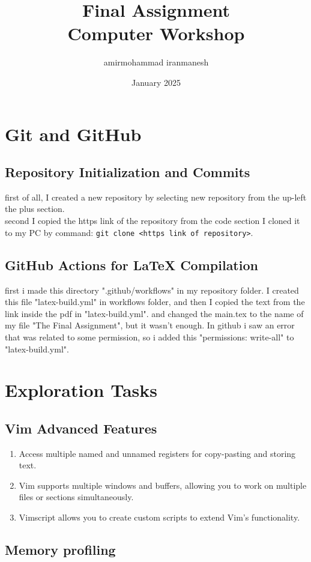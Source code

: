 \documentclass{article}
\title{Final Assignment\\[0.2cm]Computer Workshop}
\author{amirmohammad iranmanesh}
\date{January 2025}
\begin{document}
\maketitle
\newpage
\section{Git and GitHub}
    \subsection{Repository Initialization and Commits}
    first of all, I created a new repository by selecting new repository from the up-left the plus section.
    \\ second I copied the https link of the repository from the code section I cloned it to my PC by command: \texttt{git clone \textless https link of repository\textgreater}.
    \subsection{GitHub Actions for LaTeX Compilation}
     first i made this directory ".github/workflows" in my repository folder. I created this file "latex-build.yml" in workflows folder, and then I copied the text from the link inside the pdf in "latex-build.yml". and changed the main.tex to the name of my file "The Final Assignment", but it wasn't enough. In github i saw an error that was related to some permission, so i added this "permissions: write-all" to  "latex-build.yml".

\section{Exploration Tasks}
    \subsection{Vim Advanced Features}
    \begin{enumerate}
        \item Access multiple named and unnamed registers for copy-pasting and storing text.
        \item Vim supports multiple windows and buffers, allowing you to work on multiple files or sections simultaneously.
        \item Vimscript allows you to create custom scripts to extend Vim's functionality.
    \end{enumerate}
    \subsection{Memory profiling}
\end{document}
